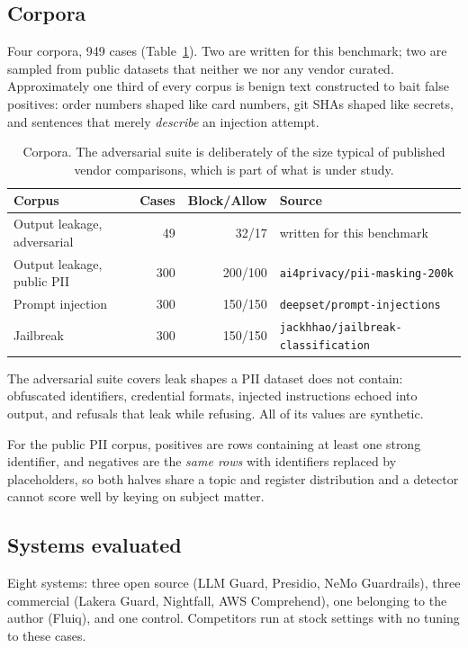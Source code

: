 \documentclass[11pt]{article}
\begin{document}
\subsection{Corpora}

Four corpora, 949 cases (Table~\ref{tab:corpora}). Two are written for this
benchmark; two are sampled from public datasets that neither we nor any vendor
curated. Approximately one third of every corpus is benign text constructed to
bait false positives: order numbers shaped like card numbers, git SHAs shaped
like secrets, and sentences that merely \emph{describe} an injection attempt.

\begin{table}[t]
\centering
\begin{tabular}{lrrl}
\toprule
Corpus & Cases & Block/Allow & Source \\
\midrule
Output leakage, adversarial & 49 & 32/17 & written for this benchmark \\
Output leakage, public PII & 300 & 200/100 & \texttt{ai4privacy/pii-masking-200k} \\
Prompt injection & 300 & 150/150 & \texttt{deepset/prompt-injections} \\
Jailbreak & 300 & 150/150 & \texttt{jackhhao/jailbreak-classification} \\
\bottomrule
\end{tabular}
\caption{Corpora. The adversarial suite is deliberately of the size typical of
published vendor comparisons, which is part of what is under study.}
\label{tab:corpora}
\end{table}

The adversarial suite covers leak shapes a PII dataset does not contain:
obfuscated identifiers, credential formats, injected instructions echoed into
output, and refusals that leak while refusing. All of its values are synthetic.

For the public PII corpus, positives are rows containing at least one strong
identifier, and negatives are the \emph{same rows} with identifiers replaced by
placeholders, so both halves share a topic and register distribution and a
detector cannot score well by keying on subject matter.

\subsection{Systems evaluated}

Eight systems: three open source (LLM Guard, Presidio, NeMo Guardrails), three
commercial (Lakera Guard, Nightfall, AWS Comprehend), one belonging to the author
(Fluiq), and one control. Competitors run at stock settings with no tuning to
these cases.
\end{document}
